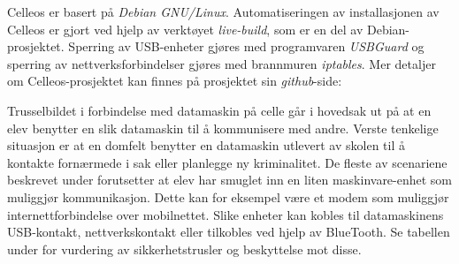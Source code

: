 
Celleos er basert p\aa{} {\it Debian GNU/Linux}. Automatiseringen av installasjonen av Celleos er gjort ved hjelp av verkt\o yet {\it live-build}, som er en del av Debian-prosjektet. Sperring av USB-enheter gj\o res med programvaren {\it USBGuard} og sperring av nettverksforbindelser gj\o res med brannmuren {\it iptables}. Mer detaljer om Celleos-prosjektet kan finnes p\aa{} prosjektet sin {\it github}-side:
\vskip 8pt


Trusselbildet i forbindelse med datamaskin p\aa{} celle g\aa r i hovedsak ut p\aa{} at en elev benytter en slik datamaskin til \aa{} kommunisere med andre. Verste tenkelige situasjon er at en domfelt benytter en datamaskin utlevert av skolen til \aa{} kontakte forn\ae rmede i sak eller planlegge ny kriminalitet.
De fleste av scenariene beskrevet under forutsetter at elev har smuglet inn en liten maskinvare-enhet som muliggj\o r kommunikasjon. Dette kan for eksempel v\ae re et modem som muliggj\o r internettforbindelse over mobilnettet. Slike enheter kan kobles til datamaskinens USB-kontakt, nettverkskontakt eller tilkobles ved hjelp av BlueTooth. Se tabellen under for vurdering av sikkerhetstrusler og beskyttelse mot disse.

\vfill\eject
\topglue 1pc

\def\firstcolwidth{12pc}
\def\secondcolwidth{19pc}
\def\tablerow#1#2{
\vbox{
\btexdraw
\drawdim pc
\textref h:L v:T
\move(0 0) \htext{\vbox{\hsize=\firstcolwidth \noindent\raggedright #1}}
\move(16 0) \htext{\vbox{\hsize=\secondcolwidth \noindent\raggedright #2}}
\etexdraw
}}
\def\tablehline{
\vbox{
\btexdraw
\drawdim pc
\move(0 0) \linewd 0.01 \lvec(35 0)
\etexdraw}
}

\def\tabletopline{
\vbox{
\btexdraw
\drawdim pc
\move(0 0) \linewd 0.07 \lvec(35 0)
\move(0 0.1) \linewd 0.02 \lvec(35 0.1)
\etexdraw}
}
\def\tablebottomline{
\vbox{
\btexdraw
\drawdim pc
\move(0 0) \linewd 0.07 \lvec(35 0)
\move(0 -0.1) \linewd 0.02 \lvec(35 -0.1)
\etexdraw}
}



